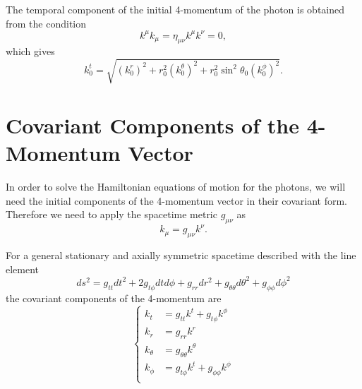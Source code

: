 The temporal component of the initial 4-momentum of the photon is obtained from the condition 
\begin{equation}
k^\mu k_\mu =  \eta_{\mu \nu} k^\mu k^\nu = 0,
\end{equation}
which gives
\begin{equation}
k^t_0 = \sqrt{(k^r_0)^2 + r_0^2 (k^\theta _0)^2 + r_0^2 \sin^2 \theta_0 (k^\phi _0)^2}. \label{initialTempMomentum2}
\end{equation}

\section{Covariant Components of the 4-Momentum Vector}
In order to solve the Hamiltonian equations of motion for the photons, we will need the initial components of the 4-momentum vector in their covariant form. Therefore we need to apply the spacetime metric $g_{\mu \nu}$ as
\begin{equation}
k_\mu = g_{\mu \nu} k^\nu.
\end{equation}

For a general stationary and axially symmetric spacetime described with the line element
\begin{equation}
ds^2 = g_{tt} dt^2 + 2g_{t \phi} dt d\phi + g_{rr} dr^2 + g_{\theta \theta} d\theta^2 + g_{\phi \phi} d\phi^2
\end{equation}
the covariant components of the 4-momentum are
\begin{equation}
\begin{cases}
k_t &= g_{tt} k^t + g_{t \phi} k^\phi\\
k_r &= g_{rr} k^r \\
k_\theta &= g_{\theta \theta} k^\theta \\
k_\phi &=  g_{t \phi} k^t + g_{\phi \phi} k^\phi\\
\end{cases}
\end{equation}